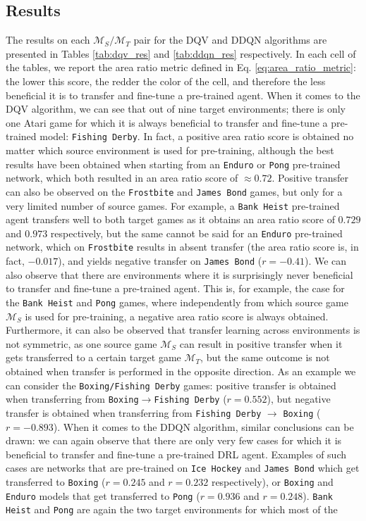 \subsection{Results}
\label{sec:results_1}

The results on each $\mathcal{M}_S/\mathcal{M}_T$ pair for the DQV and DDQN algorithms are presented in Tables \ref{tab:dqv_res} and \ref{tab:ddqn_res} respectively. In each cell of the tables, we report the area ratio metric defined in Eq. \ref{eq:area_ratio_metric}: the lower this score, the redder the color of the cell, and therefore the less beneficial it is to transfer and fine-tune a pre-trained agent. When it comes to the DQV algorithm, we can see that out of nine target environments; there is only one Atari game for which it is always beneficial to transfer and fine-tune a pre-trained model: \texttt{Fishing Derby}. In fact, a positive area ratio score is obtained no matter which source environment is used for pre-training, although the best results have been obtained when starting from an \texttt{Enduro} or \texttt{Pong} pre-trained network, which both resulted in an area ratio score of $\approx 0.72$. Positive transfer can also be observed on the \texttt{Frostbite} and \texttt{James Bond} games, but only for a very limited number of source games. For example, a \texttt{Bank Heist} pre-trained agent transfers well to both target games as it obtains an area ratio score of $0.729$ and $0.973$ respectively, but the same cannot be said for an \texttt{Enduro} pre-trained network, which on \texttt{Frostbite} results in absent transfer (the area ratio score is, in fact, $-0.017$), and yields negative transfer on \texttt{James Bond} ($r=-0.41$). We can also observe that there are environments where it is surprisingly never beneficial to transfer and fine-tune a pre-trained agent. This is, for example, the case for the \texttt{Bank Heist} and \texttt{Pong} games, where independently from which source game $\mathcal{M}_S$ is used for pre-training, a negative area ratio score is always obtained. Furthermore, it can also be observed that transfer learning across environments is not symmetric, as one source game $\mathcal{M}_S$ can result in positive transfer when it gets transferred to a certain target game $\mathcal{M}_T$, but the same outcome is not obtained when transfer is performed in the opposite direction. As an example we can consider the \texttt{Boxing/Fishing Derby} games: positive transfer is obtained when transferring from \texttt{Boxing}$\rightarrow$\texttt{Fishing Derby} ($r=0.552$), but negative transfer is obtained when transferring from \texttt{Fishing Derby} $\rightarrow$ \texttt{Boxing} ($r=-0.893$). When it comes to the DDQN algorithm, similar conclusions can be drawn: we can again observe that there are only very few cases for which it is beneficial to transfer and fine-tune a pre-trained DRL agent. Examples of such cases are networks that are pre-trained on \texttt{Ice Hockey} and \texttt{James Bond} which get transferred to \texttt{Boxing} ($r=0.245$ and $r=0.232$ respectively), or \texttt{Boxing} and \texttt{Enduro} models that get transferred to \texttt{Pong} ($r=0.936$ and $r=0.248$). \texttt{Bank Heist} and \texttt{Pong} are again the two target environments for which most of the 